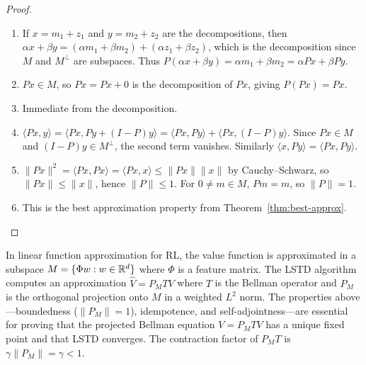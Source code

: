 \documentclass[11pt,a4paper]{article}
\begin{document}
\begin{proof}
\begin{enumerate}[label=(\roman*)]
    \item If $x = m_1 + z_1$ and $y = m_2 + z_2$ are the decompositions,
          then
          $\alpha x + \beta y = (\alpha m_1 + \beta m_2)
          + (\alpha z_1 + \beta z_2)$, which is the decomposition since
          $M$ and $M^\perp$ are subspaces. Thus
          $P(\alpha x + \beta y) = \alpha m_1 + \beta m_2
          = \alpha Px + \beta Py$.

    \item $Px \in M$, so $Px = Px + 0$ is the decomposition of $Px$,
          giving $P(Px) = Px$.

    \item Immediate from the decomposition.

    \item $\langle Px, y \rangle
          = \langle Px, Py + (I - P)y \rangle
          = \langle Px, Py \rangle + \langle Px, (I-P)y \rangle$.
          Since $Px \in M$ and $(I-P)y \in M^\perp$, the second term
          vanishes. Similarly
          $\langle x, Py \rangle = \langle Px, Py \rangle$.

    \item $\|Px\|^2 = \langle Px, Px \rangle = \langle Px, x \rangle
          \leq \|Px\| \|x\|$ by Cauchy--Schwarz, so
          $\|Px\| \leq \|x\|$, hence $\|P\| \leq 1$. For
          $0 \neq m \in M$, $Pm = m$, so $\|P\| = 1$.

    \item This is the best approximation property from
          Theorem~\ref{thm:best-approx}. \qedhere
\end{enumerate}
\end{proof}

\begin{rlconnection}[title={Projection Operators in TD Learning}]
In linear function approximation for RL, the value function is
approximated in a subspace $M = \{\Phi w : w \in \mathbb{R}^d\}$ where
$\Phi$ is a feature matrix. The LSTD algorithm computes an approximation
$\hat{V} = P_M T V$ where $T$ is the Bellman operator and $P_M$ is the
orthogonal projection onto $M$ in a weighted $L^2$ norm. The properties
above---boundedness ($\|P_M\| = 1$), idempotence, and
self-adjointness---are essential for proving that the projected Bellman
equation $V = P_M T V$ has a unique fixed point and that LSTD converges.
The contraction factor of $P_M T$ is $\gamma \|P_M\| = \gamma < 1$.
\end{rlconnection}
\end{document}
